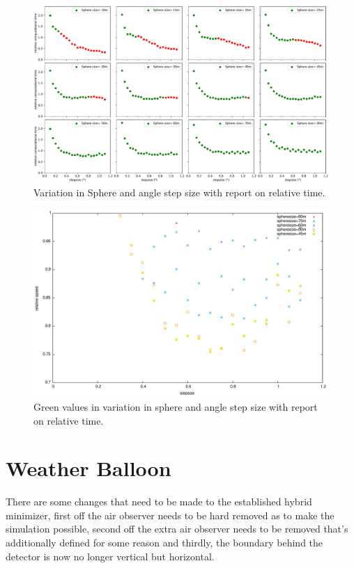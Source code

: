 \documentclass[11pt,a4paper,faculty=we,language=en,doctype=report]{cls/ugent-doc}
\begin{document}
\begin{figure}
	\includegraphics[width=\textwidth]{figures/subplotofallstepsphere.pdf}
	\caption{Variation in Sphere and angle step size with report on relative time.}
	\label{fig:SphereStepInfl}
\end{figure}

\begin{figure}
	\includegraphics[width=\textwidth]{figures/SphereAndStepFinal.pdf}
	\caption{Green values in variation in sphere and angle step size with report on relative time.}
	\label{fig:SphereStepFinal}
\end{figure}

\chapter{Weather Balloon}
There are some changes that need to be made to the established hybrid minimizer, first off the air observer needs
to be hard removed as to make the simulation possible, second off the extra air observer needs to be removed that's additionally
defined for some reason and thirdly, the boundary behind the detector is now no longer vertical but horizontal.
\end{document}
